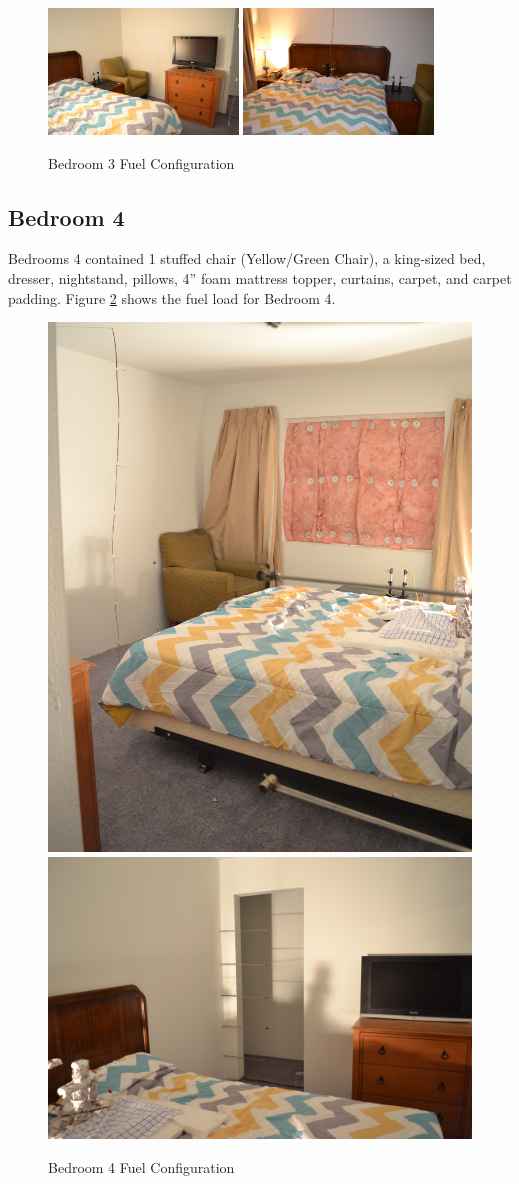 \documentclass[12pt,oneside]{book}
\begin{document}
\begin{figure}[H]
\centering
\includegraphics[width=0.45\textwidth]{../0_Images/Fuel/Bedroom_3_1.jpg}
\includegraphics[width=0.45\textwidth]{../0_Images/Fuel/Bedroom_3_2.jpg}
\caption{Bedroom 3 Fuel Configuration}
\label{figure:Bed3_fuel}
\end{figure}

\subsection*{Bedroom 4}
Bedrooms 4 contained 1 stuffed chair (Yellow/Green Chair), a king-sized bed, dresser, nightstand, pillows, 4'' foam mattress topper, curtains, carpet, and carpet padding. Figure \ref{figure:Bed4_fuel} shows the fuel load for Bedroom 4.

\begin{figure}[H]
\centering
\includegraphics[height=0.40\textwidth]{../0_Images/Fuel/Bedroom_4_1.jpg}
\includegraphics[height=0.40\textwidth]{../0_Images/Fuel/Bedroom_4_2.jpg}
\caption{Bedroom 4 Fuel Configuration}
\label{figure:Bed4_fuel}
\end{figure}
\end{document}
